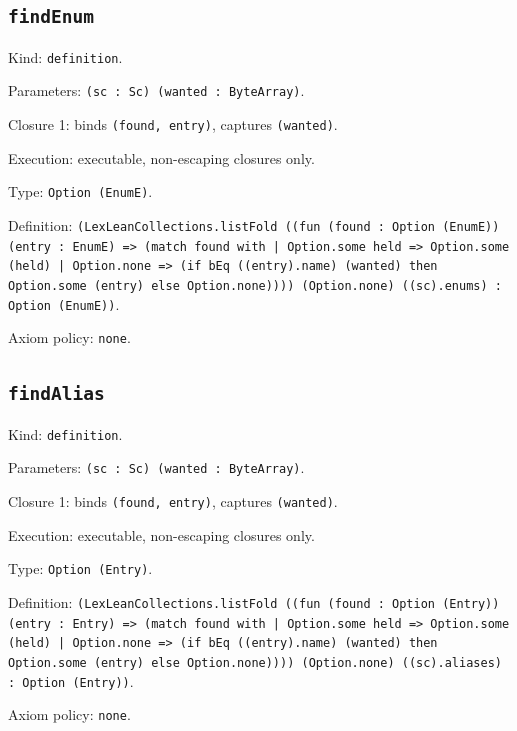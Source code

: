 \documentclass[11pt]{article}
\begin{document}
\subsection*{\texttt{findEnum}}
\noindent Kind: \texttt{definition}.\par
\noindent Parameters: \texttt{(sc : Sc) (wanted : ByteArray)}.\par
\noindent Closure 1: binds \texttt{(found, entry)}, captures \texttt{(wanted)}.\par
\noindent Execution: executable, non-escaping closures only.\par
\noindent Type: \texttt{Option (EnumE)}.\par
\noindent Definition: \texttt{(LexLeanCollections.listFold ((fun (found : Option (EnumE)) (entry : EnumE) => (match found with | Option.some held => Option.some (held) | Option.none => (if bEq ((entry).name) (wanted) then Option.some (entry) else Option.none)))) (Option.none) ((sc).enums) : Option (EnumE))}.\par
\noindent Axiom policy: \texttt{none}.\par
\subsection*{\texttt{findAlias}}
\noindent Kind: \texttt{definition}.\par
\noindent Parameters: \texttt{(sc : Sc) (wanted : ByteArray)}.\par
\noindent Closure 1: binds \texttt{(found, entry)}, captures \texttt{(wanted)}.\par
\noindent Execution: executable, non-escaping closures only.\par
\noindent Type: \texttt{Option (Entry)}.\par
\noindent Definition: \texttt{(LexLeanCollections.listFold ((fun (found : Option (Entry)) (entry : Entry) => (match found with | Option.some held => Option.some (held) | Option.none => (if bEq ((entry).name) (wanted) then Option.some (entry) else Option.none)))) (Option.none) ((sc).aliases) : Option (Entry))}.\par
\noindent Axiom policy: \texttt{none}.\par
\end{document}
